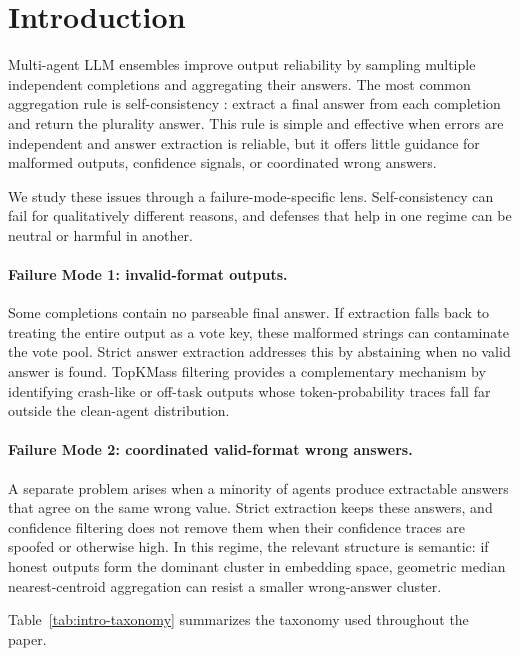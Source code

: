 \documentclass[11pt]{article}
\begin{document}
\section{Introduction}
\label{sec:intro}

Multi-agent LLM ensembles improve output reliability by sampling multiple
independent completions and aggregating their answers. The most common
aggregation rule is self-consistency \citep{wang2023self}: extract a final answer
from each completion and return the plurality answer. This rule is simple and
effective when errors are independent and answer extraction is reliable, but it
offers little guidance for malformed outputs, confidence signals, or coordinated
wrong answers.

We study these issues through a failure-mode-specific lens. Self-consistency can
fail for qualitatively different reasons, and defenses that help in one regime
can be neutral or harmful in another.

\paragraph{Failure Mode 1: invalid-format outputs.}
Some completions contain no parseable final answer. If extraction falls back to
treating the entire output as a vote key, these malformed strings can contaminate
the vote pool. Strict answer extraction addresses this by abstaining when no
valid answer is found. TopKMass filtering provides a complementary mechanism by
identifying crash-like or off-task outputs whose token-probability traces fall
far outside the clean-agent distribution.

\paragraph{Failure Mode 2: coordinated valid-format wrong answers.}
A separate problem arises when a minority of agents produce extractable answers
that agree on the same wrong value. Strict extraction keeps these answers, and
confidence filtering does not remove them when their confidence traces are
spoofed or otherwise high. In this regime, the relevant structure is semantic:
if honest outputs form the dominant cluster in embedding space, geometric median
nearest-centroid aggregation can resist a smaller wrong-answer cluster.

Table~\ref{tab:intro-taxonomy} summarizes the taxonomy used throughout the paper.
\end{document}
